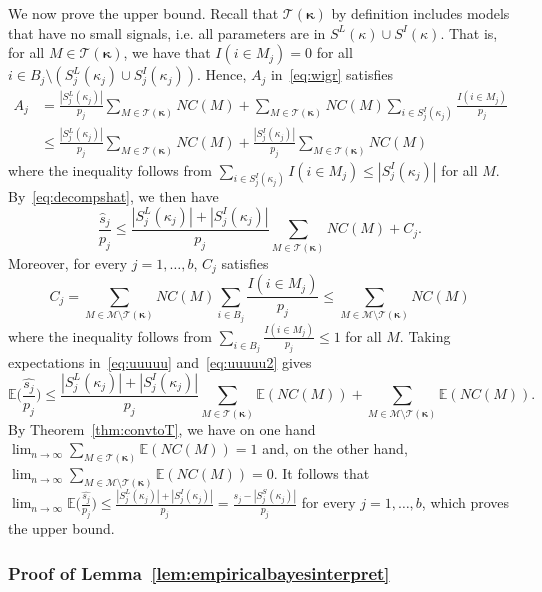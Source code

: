 \documentclass[
  12pt]{article}
\newcommand{\E}{\mathbb{E}}
\newcommand{\M}{\mathcal{M}}
\newcommand{\T}{\mathcal{T}}
\newcommand{\bkappa}{\boldsymbol{\kappa}}
\begin{document}
We now prove the upper bound. Recall that $\T(\bkappa)$ by definition includes models that have no small signals, i.e. all parameters are in $S^L(\kappa) \cup S^I(\kappa)$. That is,
for all $M\in\T(\bkappa)$, we have that $I(i\in M_j)=0$ for all $i\in B_j\setminus(S_j^{L}(\kappa_j)\cup S_j^{I}(\kappa_j))$. Hence, $A_j$ in~\eqref{eq:wigr} satisfies
\begin{align*}
    A_j
   &= \frac{|S_j^{L}(\kappa_j)|}{p_j}\sum_{M \in \T(\bkappa)}NC(M)+\sum_{M \in \T(\bkappa)}NC(M)\sum_{i \in S_j^{I}(\kappa_j)}\frac{I(i\in M_j)}{p_j}\\
   &\leq\frac{|S_j^{L}(\kappa_j)|}{p_j}\sum_{M \in \T(\bkappa)}NC(M)+ \frac{|S_j^{I}(\kappa_j)|}{p_j}\sum_{M \in \T(\bkappa)}NC(M)
\end{align*}
where the inequality follows from $\sum_{i \in S_j^{I}(\kappa_j)} I(i\in M_j) \leq |S_j^{I}(\kappa_j)|$  for all $M$. By~\eqref{eq:decompshat}, we then have
\begin{equation}\label{eq:uuuuu}
    \frac{\hat{s}_j}{p_j}\leq \frac{|S_j^{L}(\kappa_j)|+|S_j^{I}(\kappa_j)|}{p_j}\sum_{M \in \T(\bkappa)}NC(M) + C_j.
\end{equation}
Moreover, for every $j=1,\ldots,b$, $C_j$ satisfies
\begin{equation}\label{eq:uuuuu2}
    C_j = \sum_{M \in \M\setminus \T(\bkappa)}NC(M)\sum_{i \in B_j}\frac{I(i\in M_j)}{p_j}\leq \sum_{M \in \M\setminus \T(\bkappa)}NC(M)
\end{equation}
where the inequality follows from $\sum_{i \in B_j}\frac{I(i\in M_j)}{p_j}\leq 1$ for all $M$.
Taking expectations in~\eqref{eq:uuuuu} and~\eqref{eq:uuuuu2} gives
\begin{equation*}
    \E\bigg(\frac{\widehat{s_j}}{p_j}\bigg) 
    \leq \frac{|S_j^{L}(\kappa_j)|+|S_j^{I}(\kappa_j)|}{p_j}\sum_{M \in \T(\bkappa)}\E(NC(M)) + \sum_{M \in \M\setminus \T(\bkappa)}\E(NC(M)).
\end{equation*}
 By Theorem~\ref{thm:convtoT}, we have on one hand $\lim_{n\to \infty}\sum_{M \in \T(\bkappa)}\E(NC(M))= 1$ and, on the other hand, $\lim_{n\to \infty}\sum_{M \in \M\setminus\T(\bkappa)}\E(NC(M))= 0$. It follows that $ \lim_{n\to \infty}\E\big(\frac{\widehat{s_j}}{p_j}\big) \leq  \frac{|S_j^{L}(\kappa_j)|+|S_j^{I}(\kappa_j)|}{p_j}= \frac{s_j-|S_j^{S}(\kappa_j)|}{p_j}$ for every $j=1,\ldots,b$, which proves the upper bound.

 \subsubsection{Proof of Lemma~\ref{lem:empiricalbayesinterpret}}
\end{document}
